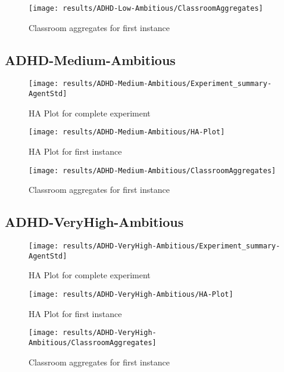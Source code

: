 \begin{figure}[H]
    \centering
    \texttt{[image: results/ADHD-Low-Ambitious/ClassroomAggregates]}
    \caption{Classroom aggregates for first instance}
    \label{result:LA-Classroom}
\end{figure}

\subsection{ADHD-Medium-Ambitious}

\begin{figure}[H]
    \centering
    \texttt{[image: results/ADHD-Medium-Ambitious/Experiment\_summary-AgentStd]}
    \caption{HA Plot for complete experiment}
\end{figure}

\begin{figure}[H]
    \centering
    \texttt{[image: results/ADHD-Medium-Ambitious/HA-Plot]}
    \caption{HA Plot for first instance}
    \label{results:MA-HAPlot}
\end{figure}

\begin{figure}[H]
    \centering
    \texttt{[image: results/ADHD-Medium-Ambitious/ClassroomAggregates]}
    \caption{Classroom aggregates for first instance}
\end{figure}

\subsection{ADHD-VeryHigh-Ambitious}

\begin{figure}[H]
    \centering
    \texttt{[image: results/ADHD-VeryHigh-Ambitious/Experiment\_summary-AgentStd]}
    \caption{HA Plot for complete experiment}
\end{figure}

\begin{figure}[H]
    \centering
    \texttt{[image: results/ADHD-VeryHigh-Ambitious/HA-Plot]}
    \caption{HA Plot for first instance}
    \label{results:VHA-HAPlot}
\end{figure}

\begin{figure}[H]
    \centering
    \texttt{[image: results/ADHD-VeryHigh-Ambitious/ClassroomAggregates]}
    \caption{Classroom aggregates for first instance}
    \label{result:VHA-Classroom}
\end{figure}

